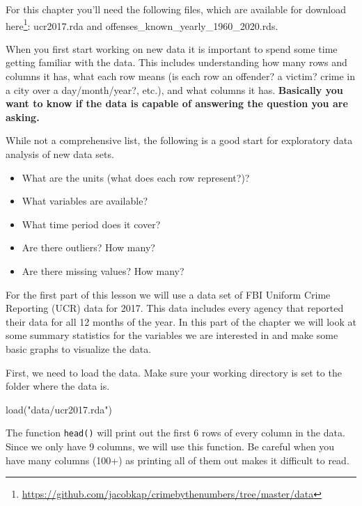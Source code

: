 \documentclass[
]{krantz}
\makeatletter
\newenvironment{Shaded}{\begin{snugshade}}{\end{snugshade}}
\newcommand{\FunctionTok}[1]{\textcolor[rgb]{0,0,0}{#1}}
\newcommand{\NormalTok}[1]{#1}
\newcommand{\StringTok}[1]{\textcolor[rgb]{0.5,0.5,0.5}{#1}}
\providecommand{\tightlist}{%
  \setlength{\itemsep}{0pt}\setlength{\parskip}{0pt}}
\renewcommand{\href}[2]{#2\footnote{\url{#1}}}
\newenvironment{kframe}{%
\medskip{}
\setlength{\fboxsep}{.8em}
 \def\at@end@of@kframe{}%
 \ifinner\ifhmode%
  \def\at@end@of@kframe{\end{minipage}}%
  \begin{minipage}{\columnwidth}%
 \fi\fi%
 \def\FrameCommand##1{\hskip\@totalleftmargin \hskip-\fboxsep
 \colorbox{shadecolor}{##1}\hskip-\fboxsep
     \hskip-\linewidth \hskip-\@totalleftmargin \hskip\columnwidth}%
 \MakeFramed {\advance\hsize-\width
   \@totalleftmargin\z@ \linewidth\hsize
   \@setminipage}}%
 {\par\unskip\endMakeFramed%
 \at@end@of@kframe}
\renewenvironment{Shaded}{\begin{kframe}}{\end{kframe}}
\makeatother
\begin{document}
For this chapter you'll need the following files, which are
available for download
\href{https://github.com/jacobkap/crimebythenumbers/tree/master/data}{here}:
ucr2017.rda and offenses\_known\_yearly\_1960\_2020.rds.

When you first start working on new data it is important to
spend some time getting familiar with the data. This
includes understanding how many rows and columns it has,
what each row means (is each row an offender? a victim?
crime in a city over a day/month/year?, etc.), and what
columns it has. \textbf{Basically you want to know if the
data is capable of answering the question you are asking.}

While not a comprehensive list, the following is a good
start for exploratory data analysis of new data sets.

\begin{itemize}
\tightlist
\item
  What are the units (what does each row represent?)?
\item
  What variables are available?
\item
  What time period does it cover?
\item
  Are there outliers? How many?
\item
  Are there missing values? How many?
\end{itemize}

For the first part of this lesson we will use a data set of
FBI Uniform Crime Reporting (UCR) data for 2017. This data
includes every agency that reported their data for all 12
months of the year. In this part of the chapter we will look
at some summary statistics for the variables we are
interested in and make some basic graphs to visualize the
data.

First, we need to load the data. Make sure your working
directory is set to the folder where the data is.

\begin{Shaded}
\begin{Highlighting}[]
\FunctionTok{load}\NormalTok{(}\StringTok{"data/ucr2017.rda"}\NormalTok{)}
\end{Highlighting}
\end{Shaded}

The function \texttt{head()} will print out the first 6 rows
of every column in the data. Since we only have 9 columns,
we will use this function. Be careful when you have many
columns (100+) as printing all of them out makes it
difficult to read.
\end{document}
